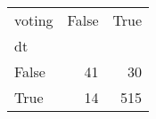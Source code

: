 \begin{tabular}{lrr}
\toprule
voting &  False &  True  \\
dt    &        &        \\
\midrule
False &     41 &     30 \\
True  &     14 &    515 \\
\bottomrule
\end{tabular}

